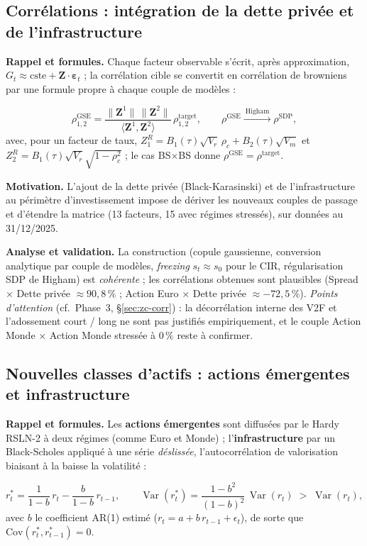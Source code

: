 \documentclass[11pt,a4paper]{article}
\begin{document}
\subsection{Corrélations : intégration de la dette privée et de l'infrastructure}

\textbf{Rappel et formules.} Chaque facteur observable s'écrit, après approximation, $G_t\approx\text{cste}+\bm Z\cdot\bm\varepsilon_t$ ; la corrélation cible se convertit en corrélation de browniens par une formule propre à chaque couple de modèles :
\begin{definitionbox}
\[
\rho^{\mathrm{GSE}}_{1,2}=\frac{\lVert\bm Z^1\rVert\,\lVert\bm Z^2\rVert}{\langle\bm Z^1,\bm Z^2\rangle}\,\rho^{\mathrm{target}}_{1,2},\qquad
\rho^{\mathrm{GSE}}\xrightarrow{\ \text{Higham}\ }\rho^{\mathrm{SDP}},
\]
avec, pour un facteur de taux, $Z_1^{R}=B_1(\tau)\sqrt{V_r}\,\rho_c+B_2(\tau)\sqrt{V_m}$ et $Z_2^{R}=B_1(\tau)\sqrt{V_r}\sqrt{1-\rho_c^2}$ ; le cas BS$\times$BS donne $\rho^{\mathrm{GSE}}=\rho^{\mathrm{target}}$.
\end{definitionbox}

\textbf{Motivation.} L'ajout de la dette privée (Black-Karasinski) et de l'infrastructure au périmètre d'investissement impose de dériver les nouveaux couples de passage et d'étendre la matrice (13 facteurs, 15 avec régimes stressés), sur données au 31/12/2025.

\textbf{Analyse et validation.} La construction (copule gaussienne, conversion analytique par couple de modèles, \emph{freezing} $s_t\approx s_0$ pour le CIR, régularisation SDP de Higham) est \emph{cohérente} ; les corrélations obtenues sont plausibles (Spread $\times$ Dette privée $\approx90{,}8\,\%$ ; Action Euro $\times$ Dette privée $\approx-72{,}5\,\%$). \emph{Points d'attention} (cf.\ Phase~3, \S\ref{sec:zc-corr}) : la décorrélation interne des V2F et l'adossement court / long ne sont pas justifiés empiriquement, et le couple Action Monde $\times$ Action Monde stressée à $0\,\%$ reste à confirmer.

\subsection{Nouvelles classes d'actifs : actions émergentes et infrastructure}

\textbf{Rappel et formules.} Les \textbf{actions émergentes} sont diffusées par le Hardy RSLN-2 à deux régimes (comme Euro et Monde) ; l'\textbf{infrastructure} par un Black-Scholes appliqué à une série \emph{déslissée}, l'autocorrélation de valorisation biaisant à la baisse la volatilité :
\begin{definitionbox}
\[
r_t^\ast=\frac{1}{1-b}\,r_t-\frac{b}{1-b}\,r_{t-1},\qquad
\operatorname{Var}(r_t^\ast)=\frac{1-b^2}{(1-b)^2}\,\operatorname{Var}(r_t)\;>\;\operatorname{Var}(r_t),
\]
avec $b$ le coefficient AR(1) estimé ($r_t=a+b\,r_{t-1}+\epsilon_t$), de sorte que $\mathrm{Cov}(r_t^\ast,r_{t-1}^\ast)=0$.
\end{definitionbox}
\end{document}
